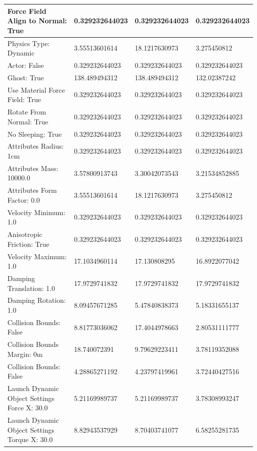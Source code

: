 \begin{table}[htbp]
\begin{tabular}{ | l || l | l | l | }
Force Field Align to Normal: True & 0.329232644023  & 0.329232644023  & 0.329232644023 \\ \hline
Physics Type: Dynamic & 3.55513601614  & 18.1217630973  & 3.275450812 \\ \hline
\rowcolor{cyan}
Actor: False & 0.329232644023  & 0.329232644023  & 0.329232644023 \\ \hline
Ghost: True & 138.489494312  & 138.489494312  & 132.02387242 \\ \hline
\rowcolor{cyan}
Use Material Force Field: True & 0.329232644023  & 0.329232644023  & 0.329232644023 \\ \hline
\rowcolor{cyan}
Rotate From Normal: True & 0.329232644023  & 0.329232644023  & 0.329232644023 \\ \hline
\rowcolor{cyan}
No Sleeping: True & 0.329232644023  & 0.329232644023  & 0.329232644023 \\ \hline
\rowcolor{cyan}
Attributes Radius: 1cm & 0.329232644023  & 0.329232644023  & 0.329232644023 \\ \hline
Attributes Mass: 10000.0 & 3.57800913743  & 3.30042073543  & 3.21534852885 \\ \hline
Attributes Form Factor: 0.0 & 3.55513601614  & 18.1217630973  & 3.275450812 \\ \hline
\rowcolor{cyan}
Velocity Minimum: 1.0 & 0.329232644023  & 0.329232644023  & 0.329232644023 \\ \hline
\rowcolor{cyan}
Anisotropic Friction: True & 0.329232644023  & 0.329232644023  & 0.329232644023 \\ \hline
Velocity Maximum: 1.0 & 17.1034960114  & 17.130808295  & 16.8922077042 \\ \hline
Damping Translation: 1.0 & 17.9729741832 & 17.9729741832 & 17.9729741832 \\ \hline
Damping Rotation: 1.0 & 8.09457671285 & 5.47840838373 & 5.18331655137 \\ \hline
Collision Bounds: False & 8.81773036062 & 17.4044978663 & 2.80531111777 \\ \hline
Collision Bounds Margin: 0m & 18.740072391  & 9.79629223411  & 3.78119352088 \\ \hline
Collision Bounds: False & 4.28865271192  & 4.23797419961  & 3.72440427516 \\ \hline
Launch Dynamic Object Settings Force X: 30.0 & 5.21169989737  & 5.21169989737  & 3.78308993247 \\ \hline
Launch Dynamic Object Settings Torque X: 30.0 & 8.82943537929  & 8.70403741077  & 6.58255281735 \\ \hline

\end{tabular}
\end{table}
